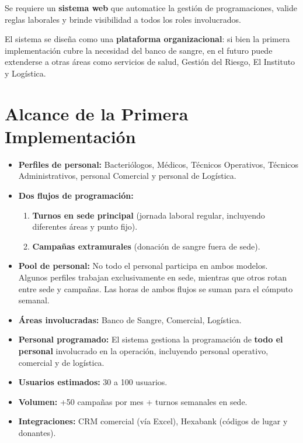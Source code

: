 \documentclass[9pt,a4paper]{extarticle}
\begin{document}
Se requiere un \textbf{sistema web} que automatice la gesti\'{o}n de programaciones, valide reglas laborales y brinde visibilidad a todos los roles involucrados.

El sistema se diseña como una \textbf{plataforma organizacional}: si bien la primera implementaci\'{o}n cubre la necesidad del banco de sangre, en el futuro puede extenderse a otras \'{a}reas como servicios de salud, Gesti\'{o}n del Riesgo, El Instituto y Log\'{i}stica.

\section{Alcance de la Primera Implementaci\'{o}n}

\begin{itemize}[leftmargin=2em]
    \item \textbf{Perfiles de personal:} Bacteri\'{o}logos, M\'{e}dicos, T\'{e}cnicos Operativos, T\'{e}cnicos Administrativos, personal Comercial y personal de Log\'{i}stica.
    \item \textbf{Dos flujos de programaci\'{o}n:}
    \begin{enumerate}
        \item \textbf{Turnos en sede principal} (jornada laboral regular, incluyendo diferentes \'{a}reas y punto fijo).
        \item \textbf{Campañas extramurales} (donaci\'{o}n de sangre fuera de sede).
    \end{enumerate}
    \item \textbf{Pool de personal:} No todo el personal participa en ambos modelos. Algunos perfiles trabajan exclusivamente en sede, mientras que otros rotan entre sede y campañas. Las horas de ambos flujos se suman para el c\'{o}mputo semanal.
    \item \textbf{\'{A}reas involucradas:} Banco de Sangre, Comercial, Log\'{i}stica.
    \item \textbf{Personal programado:} El sistema gestiona la programaci\'{o}n de \textbf{todo el personal} involucrado en la operaci\'{o}n, incluyendo personal operativo, comercial y de log\'{i}stica.
    \item \textbf{Usuarios estimados:} 30 a 100 usuarios.
    \item \textbf{Volumen:} +50 campañas por mes + turnos semanales en sede.
    \item \textbf{Integraciones:} CRM comercial (v\'{i}a Excel), Hexabank (c\'{o}digos de lugar y donantes).
\end{itemize}
\end{document}
